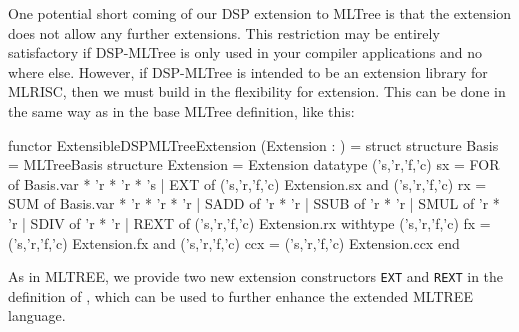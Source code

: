 One potential short coming of our DSP extension to MLTree is that
the extension does not allow any further extensions.  This restriction
may be entirely satisfactory if DSP-MLTree is only used in your compiler
applications and no where else.  However, if DSP-MLTree is intended
to be an extension library for MLRISC, then  we must build in the flexibility
for extension.  This can be done in the same way as in the base MLTree
definition, like this: 
\begin{SML}
functor ExtensibleDSPMLTreeExtension
  (Extension : ) =
struct
   structure Basis = MLTreeBasis
   structure Extension = Extension
   datatype ('s,'r,'f,'c) sx = 
      FOR of Basis.var * 'r * 'r * 's
    | EXT of ('s,'r,'f,'c) Extension.sx 
   and ('s,'r,'f,'c) rx = 
      SUM of Basis.var * 'r * 'r * 'r
    | SADD of 'r * 'r
    | SSUB of 'r * 'r
    | SMUL of 'r * 'r
    | SDIV of 'r * 'r
    | REXT of ('s,'r,'f,'c) Extension.rx
   withtype
        ('s,'r,'f,'c) fx   = ('s,'r,'f,'c) Extension.fx
   and  ('s,'r,'f,'c) ccx  = ('s,'r,'f,'c) Extension.ccx
end
\end{SML}

As in MLTREE, we provide two new extension 
constructors \verb|EXT| and \verb|REXT| in
the definition of , which  can 
be used to further enhance the extended MLTREE language.
